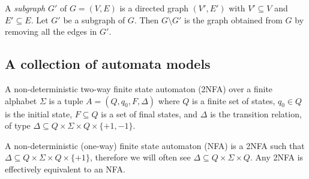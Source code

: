 \documentclass{llncs}
\begin{document}
A \emph{subgraph} $G'$ of $G=(V,E)$ is a directed graph $(V', E')$ with
$V' \subseteq V$ and $E' \subseteq E$. Let $G'$ be a subgraph of $G$. Then $G \setminus G'$ is the graph obtained from $G$ by removing all the edges in $G'$.  

\subsection{A collection of automata models}

\begin{definition}
A non-deterministic two-way finite state automaton 
(2NFA) over a finite alphabet $\Sigma$ is a tuple $A =
(Q, q_0, F, \Delta)$ where $Q$ is a finite set of states, $q_0\in Q$ is
the initial state, $F\subseteq Q$ is a set of final states, and $\Delta$ is the
transition relation, of type $\Delta\subseteq Q \times \Sigma\times Q \times \{+1, -1\}$. 

A non-deterministic (one-way) finite state automaton (NFA)
is a 2NFA such that $\Delta\subseteq Q \times \Sigma\times Q \times \{+1\}$, therefore we
will often see $\Delta\subseteq Q \times \Sigma \times Q$. Any 2NFA is
effectively equivalent to an NFA.  
\end{definition}


\end{document}
